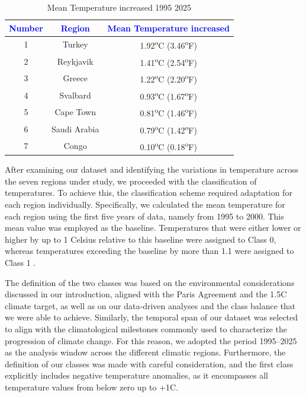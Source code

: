 \documentclass[12pt]{Definitions/academia}
\begin{document}
\begin{table}[H]
		\centering
\begin{tabular}{|c|c|c|}
\hline
\textbf{\textcolor{blue}{Number}} & \textbf{\textcolor{blue}{Region}} & \textbf{\textcolor{blue}{Mean Temperature increased}}\tabularnewline
\hline
\hline
1 & Turkey & 1.92\textsuperscript{o}C (3.46\textsuperscript{o}F)\tabularnewline
\hline
2 & Reykjavik & 1.41\textsuperscript{o}C (2.54\textsuperscript{o}F)\tabularnewline
\hline
3 & Greece & 1.22\textsuperscript{o}C (2.20\textsuperscript{o}F)\tabularnewline
\hline
4 & Svalbard & 0.93\textsuperscript{o}C (1.67\textsuperscript{o}F)\tabularnewline
\hline
5 & Cape Town & 0.81\textsuperscript{o}C (1.46\textsuperscript{o}F)\tabularnewline
\hline
6 & Saudi Arabia & 0.79\textsuperscript{o}C (1.42\textsuperscript{o}F)\tabularnewline
\hline
7 & Congo & 0.10\textsuperscript{o}C (0.18\textsuperscript{o}F)\tabularnewline
\hline
\end{tabular}

\caption{Mean Temperature increased 1995 2025\label{tab:Table-3-Mean-Temperature-increased-1995-2025}}

\end{table}

After examining our dataset and identifying the variations in temperature
across the seven regions under study, we proceeded with the classification
of temperatures. To achieve this, the classification scheme required
adaptation for each region individually. Specifically, we calculated
the mean temperature for each region using the first five years of
data, namely from 1995 to 2000. This mean value was employed as the
baseline. Temperatures that were either lower or higher by up to 1 Celsius
relative to this baseline were assigned to Class 0,
whereas temperatures exceeding the baseline by more than 1.1 
were assigned to Class 1 .

The definition of the two classes was based on the environmental considerations
discussed in our introduction, aligned with the Paris Agreement and
the 1.5\textdegree C climate target, as well as on our data-driven analyses
and the class balance that we were able to achieve. Similarly, the
temporal span of our dataset was selected to align with the climatological
milestones commonly used to characterize the progression of climate
change. For this reason, we adopted the period 1995--2025 as the
analysis window across the different climatic regions. Furthermore,
the definition of our classes was made with careful consideration,
and the first class explicitly includes negative temperature anomalies,
as it encompasses all temperature values from below zero up to +1\textdegree C.
\end{document}

